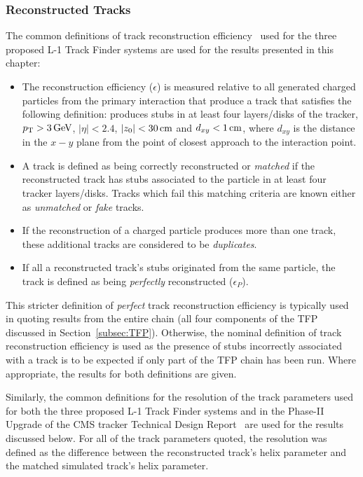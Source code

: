 \subsubsection{Reconstructed Tracks}\label{subsec:recoTracks}
The common definitions of track reconstruction efficiency~\cite{TMTT_JINST} used for the three proposed L-1 Track Finder systems are used for the results presented in this chapter:

\begin{itemize}
\item The reconstruction efficiency ($\epsilon$) is measured relative to all generated charged particles from the primary interaction that produce a track that satisfies the following definition: produces stubs in at least four layers/disks of the tracker, $p_{\mathrm{T}} > 3\,\text{Ge\hspace{-.08em}V}$, $|\eta| < 2.4$, $|z_{0}| < 30\,\text{cm}$ and $d_{xy} < 1\,\text{cm}$, where $d_{xy}$ is the distance in the $x-y$ plane from the point of closest approach to the interaction point.
\item A track is defined as being correctly reconstructed or \emph{matched} if the reconstructed track has stubs associated to the particle in at least four tracker layers/disks. Tracks which fail this matching criteria are known either as \emph{unmatched} or \emph{fake} tracks.
\item If the reconstruction of a charged particle produces more than one track, these additional tracks are considered to be \emph{duplicates}.
\item If all a reconstructed track's stubs originated from the same particle, the track is defined as being \emph{perfectly} reconstructed ($\epsilon_{P}$). 
\end{itemize}

This stricter definition of \emph{perfect} track reconstruction efficiency is typically used in quoting results from the entire chain (\ie all four components of the TFP discussed in Section~\ref{subsec:TFP}).
Otherwise, the nominal definition of track reconstruction efficiency is used as the presence of stubs incorrectly associated with a track is to be expected if only part of the TFP chain has been run.
Where appropriate, the results for both definitions are given.

Similarly, the common definitions for the resolution of the track parameters used for both the three proposed L-1 Track Finder systems and in the Phase-II Upgrade of the CMS tracker Technical Design Report~\cite{P2TrackerTDR} are used for the results discussed below.
For all of the track parameters quoted, the resolution was defined as the difference between the reconstructed track's helix parameter and the matched simulated track's helix parameter.


